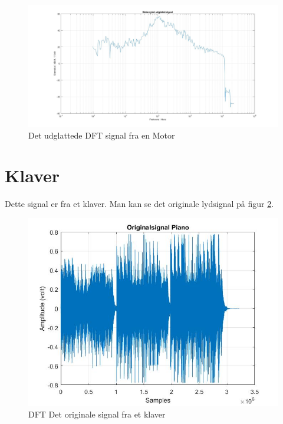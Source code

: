 \begin{figure}[H]
	\centering
	\includegraphics[width=140mm]{figures/Motor/udglattet.jpg}
	\caption{Det udglattede DFT signal fra en Motor}
	\label{fig:Motor udglattet}
\end{figure}
\newpage
\section{Klaver}
Dette signal er fra et klaver. Man kan se det originale lydsignal på figur \ref{fig:Klaver original}.
\begin{figure}[H]
	\centering
	\includegraphics[width=140mm]{figures/Piano/original.jpg}
	\caption{DFT Det originale signal fra et klaver}
	\label{fig:Klaver original}
\end{figure}

